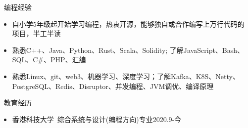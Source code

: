 \documentclass[UTF8]{resume}
\begin{document}
  
\begin{rSection}{\faCogs~编程经验}
    \begin{itemize}
        \itemsep -0.5em
        \item 自小学5年级起开始学习编程，热衷开源，能够独自或合作编写上万行代码的项目，半工半读
        \item 熟悉C++、Java、Python、Rust、Scala、Solidity; 了解JavaScript、Bash、SQL、C\#、PHP、汇编
        \item 熟悉Linux、git、web3、机器学习、深度学习；了解Kafka、K8S、Netty、PostgreSQL、Redis、Disruptor、并发编程、JVM调优、编译原理
    \end{itemize}
    
\end{rSection}
\begin{rSection}{\faGraduationCap~教育经历}
    \begin{itemize}
        \item 香港科技大学~综合系统与设计(编程方向)专业\hfill 2020.9-今
    \end{itemize}
\end{rSection}
 
\end{document}
